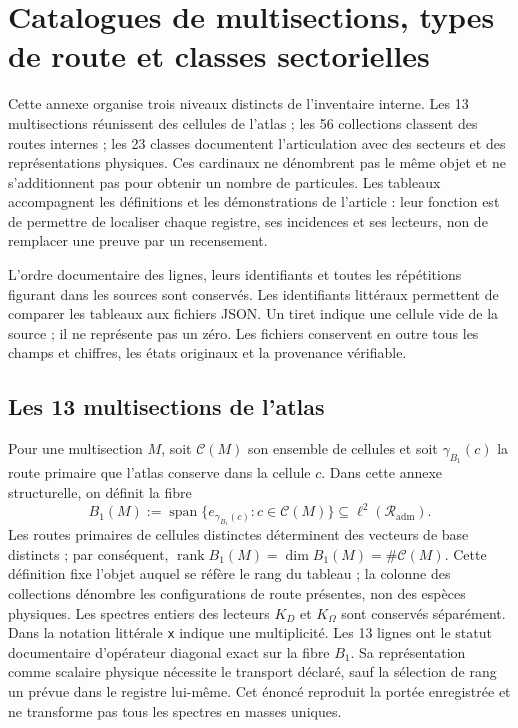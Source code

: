 \clearpage
\section{Catalogues de multisections, types de route et classes sectorielles}
\label{sec:vi-catalogos-estructurales}

Cette annexe organise trois niveaux distincts de l’inventaire interne. Les
13 multisections réunissent des cellules de l’atlas ; les 56 collections classent des routes
internes ; les 23 classes documentent l’articulation avec des secteurs et des
représentations physiques. Ces cardinaux ne dénombrent pas le même objet et
ne s’additionnent pas pour obtenir un nombre de particules. Les tableaux accompagnent les
définitions et les démonstrations de l’article : leur fonction est de permettre de localiser
chaque registre, ses incidences et ses lecteurs, non de remplacer une preuve par un recensement.

L’ordre documentaire des lignes, leurs identifiants et toutes
les répétitions figurant dans les sources sont conservés. Les identifiants littéraux
permettent de comparer les tableaux aux fichiers JSON. Un tiret indique une cellule
vide de la source ; il ne représente pas un zéro. Les fichiers conservent en outre tous
les champs et chiffres, les états originaux et la provenance vérifiable.
\CatalogRouteReference

\subsection{Les 13 multisections de l’atlas}

Pour une multisection \(M\), soit \(\mathcal C(M)\) son ensemble de cellules et
soit \(\gamma_{B_1}(c)\) la route primaire que l’atlas conserve dans la cellule
\(c\). Dans cette annexe structurelle, on définit la fibre
\[
 B_1(M):=
 \operatorname{span}\bigl\{e_{\gamma_{B_1}(c)}:c\in\mathcal C(M)\bigr\}
 \subseteq \ell^2(\mathcal R_{\mathrm{adm}}).
\]
Les routes primaires de cellules distinctes déterminent des vecteurs de base distincts ;
par conséquent,
\(\operatorname{rank}B_1(M)=\dim B_1(M)=\#\mathcal C(M)\).
Cette définition fixe l’objet auquel se réfère le rang du tableau ; la
colonne des collections dénombre les
configurations de route présentes, non des espèces physiques. Les spectres entiers
des lecteurs \(K_D\) et \(K_\Omega\) sont conservés séparément.
Dans la notation littérale \texttt{x} indique une multiplicité. Les 13 lignes ont
le statut documentaire d’opérateur diagonal exact sur la fibre \(B_1\).
Sa représentation comme scalaire physique nécessite le transport déclaré, sauf
la sélection de rang un prévue dans le registre lui-même. Cet énoncé
reproduit la portée enregistrée et ne transforme pas tous les spectres en masses uniques.


